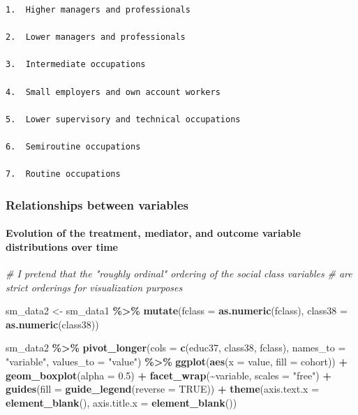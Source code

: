 \documentclass[
]{article}
\newenvironment{Shaded}{\begin{snugshade}}{\end{snugshade}}
\newcommand{\AttributeTok}[1]{\textcolor[rgb]{0.13,0.29,0.53}{#1}}
\newcommand{\CommentTok}[1]{\textcolor[rgb]{0.56,0.35,0.01}{\textit{#1}}}
\newcommand{\ConstantTok}[1]{\textcolor[rgb]{0.56,0.35,0.01}{#1}}
\newcommand{\FloatTok}[1]{\textcolor[rgb]{0.00,0.00,0.81}{#1}}
\newcommand{\FunctionTok}[1]{\textcolor[rgb]{0.13,0.29,0.53}{\textbf{#1}}}
\newcommand{\NormalTok}[1]{#1}
\newcommand{\OtherTok}[1]{\textcolor[rgb]{0.56,0.35,0.01}{#1}}
\newcommand{\SpecialCharTok}[1]{\textcolor[rgb]{0.81,0.36,0.00}{\textbf{#1}}}
\newcommand{\StringTok}[1]{\textcolor[rgb]{0.31,0.60,0.02}{#1}}
\begin{document}
\begin{verbatim}
1.  Higher managers and professionals

2.  Lower managers and professionals

3.  Intermediate occupations

4.  Small employers and own account workers

5.  Lower supervisory and technical occupations

6.  Semiroutine occupations

7.  Routine occupations
\end{verbatim}

\subsubsection{Relationships between
variables}\label{relationships-between-variables}

\paragraph{Evolution of the treatment, mediator, and outcome variable
distributions over
time}\label{evolution-of-the-treatment-mediator-and-outcome-variable-distributions-over-time}

\begin{Shaded}
\begin{Highlighting}[]
\CommentTok{\# I pretend that the "roughly ordinal" ordering of the social class variables}
\CommentTok{\# are strict orderings for visualization purposes}

\NormalTok{sm\_data2 }\OtherTok{\textless{}{-}}\NormalTok{ sm\_data1 }\SpecialCharTok{\%\textgreater{}\%}
  \FunctionTok{mutate}\NormalTok{(}\AttributeTok{fclass =} \FunctionTok{as.numeric}\NormalTok{(fclass), }
         \AttributeTok{class38 =} \FunctionTok{as.numeric}\NormalTok{(class38))}

\NormalTok{sm\_data2 }\SpecialCharTok{\%\textgreater{}\%}
  \FunctionTok{pivot\_longer}\NormalTok{(}\AttributeTok{cols =} \FunctionTok{c}\NormalTok{(educ37, class38, fclass), }\AttributeTok{names\_to =} \StringTok{"variable"}\NormalTok{, }\AttributeTok{values\_to =} \StringTok{"value"}\NormalTok{) }\SpecialCharTok{\%\textgreater{}\%}
  \FunctionTok{ggplot}\NormalTok{(}\FunctionTok{aes}\NormalTok{(}\AttributeTok{x =}\NormalTok{ value, }\AttributeTok{fill =}\NormalTok{ cohort)) }\SpecialCharTok{+}
  \FunctionTok{geom\_boxplot}\NormalTok{(}\AttributeTok{alpha =} \FloatTok{0.5}\NormalTok{) }\SpecialCharTok{+} 
  \FunctionTok{facet\_wrap}\NormalTok{(}\SpecialCharTok{\textasciitilde{}}\NormalTok{variable, }\AttributeTok{scales =} \StringTok{"free"}\NormalTok{) }\SpecialCharTok{+} 
  \FunctionTok{guides}\NormalTok{(}\AttributeTok{fill =} \FunctionTok{guide\_legend}\NormalTok{(}\AttributeTok{reverse =} \ConstantTok{TRUE}\NormalTok{)) }\SpecialCharTok{+} 
  \FunctionTok{theme}\NormalTok{(}\AttributeTok{axis.text.x =} \FunctionTok{element\_blank}\NormalTok{(),}
        \AttributeTok{axis.title.x =} \FunctionTok{element\_blank}\NormalTok{())}
\end{Highlighting}
\end{Shaded}
\end{document}
